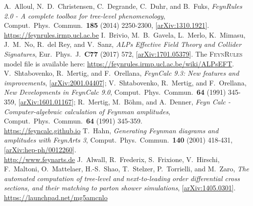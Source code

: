 \documentclass[12pt,a4wide]{article}
\begin{document}
\begin{thebibliography}{1}
    A.\ Alloul, N.\ D.\ Christensen, C.\ Degrande, C.\ Duhr, and B.\ Fuks, \textit{FeynRules 2.0 - A complete toolbox for tree-level phenomenology}, Comput.\ Phys.\ Commun.\ \textbf{185} (2014) 2250-2300, [\href{https://arxiv.org/abs/1310.1921}{arXiv:1310.1921}]. \\ \href{https://feynrules.irmp.ucl.ac.be}{https://feynrules.irmp.ucl.ac.be} 
    I.\ Brivio, M.\ B.\ Gavela, L.\ Merlo, K.\ Mimasu, J.\ M.\ No, R.\ del Rey, and V.\ Sanz, \textit{ALPs Effective Field Theory and Collider Signatures}, Eur.\ Phys.\ J.\ \textbf{C77} (2017) 572, [\href{https://arxiv.org/abs/1701.05379}{arXiv:1701.05379}]. The \textsc{FeynRules} model file is available here: \href{https://feynrules.irmp.ucl.ac.be/wiki/ALPsEFT}{https://feynrules.irmp.ucl.ac.be/wiki/ALPsEFT}. 
    V.\ Shtabovenko, R.\ Mertig, and F.\ Orellana, \textit{FeynCalc 9.3: New features and improvements}, [\href{https://arxiv.org/abs/2001.04407}{arXiv:2001.04407}]; V.\ Shtabovenko, R.\ Mertig, and F.\ Orellana, \textit{New Developments in FeynCalc 9.0}, Comput.\ Phys.\ Commun.\ \textbf{64} (1991) 345-359, [\href{https://arxiv.org/abs/1601.01167}{arXiv:1601.01167}]; R.\ Mertig, M.\ Böhm, and A.\ Denner, \textit{Feyn Calc - Computer-algebraic calculation of Feynman amplitudes}, Comput.\ Phys.\ Commun.\ \textbf{64} (1991) 345-359. \\ \href{https://feyncalc.github.io}{https://feyncalc.github.io} 
    T.\ Hahn, \textit{Generating Feynman diagrams and amplitudes with FeynArts 3}, Comput.\ Phys.\ Commun.\ \textbf{140} (2001) 418-431, [\href{https://arxiv.org/abs/hep-ph/0012260}{arXiv:hep-ph/0012260}]. \\ \href{http://www.feynarts.de}{http://www.feynarts.de} 
    J.\ Alwall, R.\ Frederix, S.\ Frixione, V.\ Hirschi, F.\ Maltoni, O.\ Mattelaer, H.-S.\ Shao, T.\ Stelzer, P.\ Torrielli, and M.\ Zaro, \textit{The automated computation of tree-level and next-to-leading order differential cross sections, and their matching to parton shower simulations}, [\href{https://arxiv.org/abs/1405.0301}{arXiv:1405.0301}]. \\ \href{https://launchpad.net/mg5amcnlo}{https://launchpad.net/mg5amcnlo} 
\end{thebibliography}
\end{document}
